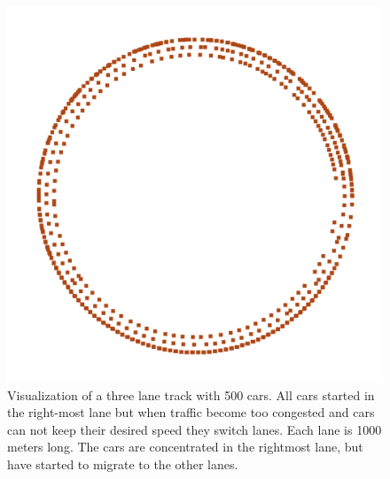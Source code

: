 \documentclass[11pt,a4paper,twocolumn]{article}
\begin{document}
\begin{figure}[ht]
    \centering
    \includegraphics[scale=0.2]{figs/circular_three_lane.png}
    \caption{Visualization of a three lane track with 500 cars. All cars started in the right-most lane but when traffic become too congested and cars can not keep their desired speed they switch lanes. Each lane is 1000 meters long. The cars are concentrated in the rightmost lane, but have started to migrate to the other lanes.}
    \label{fig:a3lanes}
\end{figure}
\end{document}
